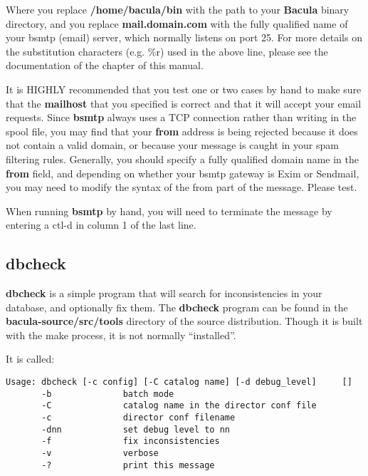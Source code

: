 Where you replace {\bf /home/bacula/bin} with the path to your {\bf Bacula}
binary directory, and you replace {\bf mail.domain.com} with the fully
qualified name of your bsmtp (email) server, which normally listens on port
25. For more details on the substitution characters (e.g. \%r) used in the
above line, please see the documentation of the 
chapter of this manual. 

It is HIGHLY recommended that you test one or two cases by hand to make sure
that the {\bf mailhost} that you specified is correct and that it will accept
your email requests. Since {\bf bsmtp} always uses a TCP connection rather
than writing in the spool file, you may find that your {\bf from} address is
being rejected because it does not contain a valid domain, or because your
message is caught in your spam filtering rules. Generally, you should specify
a fully qualified domain name in the {\bf from} field, and depending on
whether your bsmtp gateway is Exim or Sendmail, you may need to modify the
syntax of the from part of the message. Please test. 

When running {\bf bsmtp} by hand, you will need to terminate the message by
entering a ctl-d in column 1 of the last line. 

\subsection*{dbcheck}
\label{dbcheck}

{\bf dbcheck} is a simple program that will search for inconsistencies in your
database, and optionally fix them. The {\bf dbcheck} program can be found in
the {\bf \lt{}bacula-source\gt{}/src/tools} directory of the source
distribution. Though it is built with the make process, it is not normally
``installed''. 

It is called: 

\footnotesize
\begin{verbatim}
Usage: dbcheck [-c config] [-C catalog name] [-d debug_level]     []
       -b              batch mode
       -C              catalog name in the director conf file
       -c              director conf filename
       -dnn            set debug level to nn
       -f              fix inconsistencies
       -v              verbose
       -?              print this message
\end{verbatim}
\normalsize

